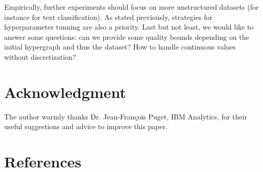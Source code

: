 \documentclass[preprint,12pt]{elsarticle}
\theoremstyle{definition}
\begin{document}
Empirically, further experiments should focus on more unstructured datasets (for instance for text classification). As stated previously, strategies for hyperparameter tunning are also a priority.
Last but not least, we would like to answer some questions: can we provide some quality bounds depending on the initial hypergraph and thus the dataset? How to handle continuous values without discretization?

\section*{Acknowledgment}

The author warmly thanks Dr. Jean-Fran\c{c}ois Puget, IBM Analytics, for their useful suggestions and advice to improve this paper.



\section*{References}


\end{document}
